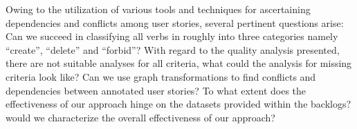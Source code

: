 Owing to the utilization of various tools and techniques for ascertaining dependencies and conflicts among user stories, several pertinent questions arise: Can we succeed in classifying all verbs in roughly into three categories namely \enquote{create}, \enquote{delete} and \enquote{forbid}? With regard to the quality analysis presented, there are not suitable analyses for all criteria, what could the analysis for missing criteria look like? Can we use graph transformations to find conflicts and dependencies between annotated user stories? To what extent does the effectiveness of our approach hinge on the datasets provided within the backlogs? would we characterize the overall effectiveness of our approach? 


